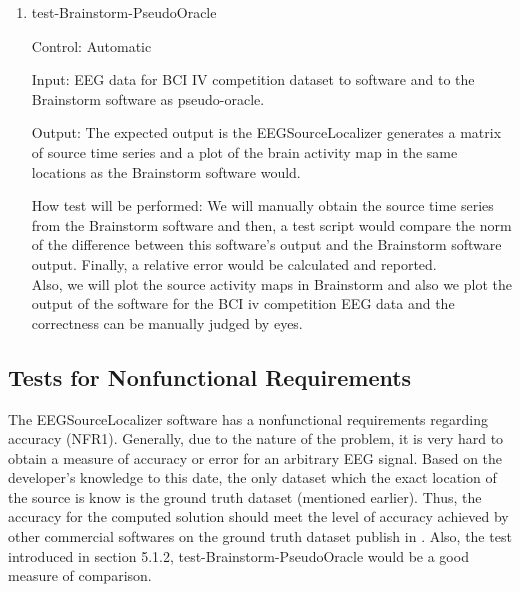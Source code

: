 \documentclass[12pt, titlepage]{article}
\renewcommand{\progname}{EEGSourceLocalizer}
\begin{document}
\begin{enumerate}
\item{test-Brainstorm-PseudoOracle\\}

Control: Automatic
					
Input: EEG data for BCI IV competition dataset \cite{dataset1BCIcompetitionIV} to software and to the Brainstorm software as pseudo-oracle. 

Output: The expected output is the \progname{} generates a matrix of source time series and a plot of the brain activity map in the same locations as the Brainstorm software would.

How test will be performed: We will manually obtain the source time series from the Brainstorm software and then, a test script would compare the norm of the difference between this software's output and the Brainstorm software output. Finally, a relative error would be calculated and reported.\\
Also, we will plot the source activity maps in Brainstorm and also we plot the output of the software for the BCI iv competition EEG data and the correctness can be manually judged by eyes. 

\end{enumerate}






\subsection{Tests for Nonfunctional Requirements}

The \progname{} software has a nonfunctional requirements regarding accuracy (NFR1). Generally, due to the nature of the problem, it is very hard to obtain a measure of accuracy or error for an arbitrary EEG signal. Based on the developer's knowledge to this date, the only dataset which the exact location of the source is know is the ground truth dataset (mentioned earlier). Thus, the accuracy for the computed solution should meet the level of accuracy achieved by other commercial softwares on the ground truth dataset publish in \cite{Mikulan2020}. Also, the test introduced in section 5.1.2, test-Brainstorm-PseudoOracle would be a good measure of comparison.
\end{document}
